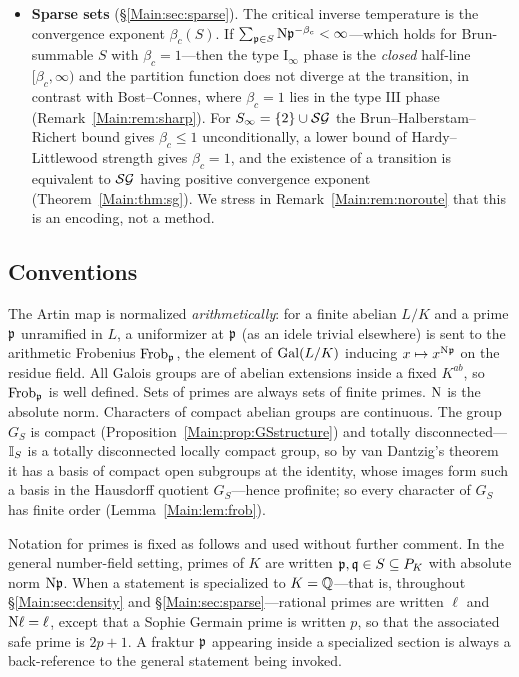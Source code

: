 \begin{itemize}
Borel--Cantelli condition, while density needs only $R\neq\emptyset$. The
underlying dichotomy is Kakutani's (Remark~\ref{Main:rem:kakutani}). We also show
$\beta\mapsto\Xi_\beta$ is non-decreasing and construct cascades of transitions
(Proposition~\ref{Main:prop:cascade}).
\item \textbf{Sparse sets} (\S\ref{Main:sec:sparse}). The critical inverse
temperature is the convergence exponent $\beta_c(S)$. If
$\sum_{\mathfrak{p}\in S}\mathrm{N}\mathfrak{p}^{-\beta_c}<\infty$---which holds for Brun-summable $S$
with $\beta_c=1$---then the type $\mathrm I_\infty$ phase is the \emph{closed}
half-line $[\beta_c,\infty)$ and the partition function does not diverge at the
transition, in contrast with Bost--Connes, where $\beta_c=1$ lies in the type
$\mathrm{III}$ phase (Remark~\ref{Main:rem:sharp}). For $S_\infty=\{2\}\cup\mathcal{SG}$ the
Brun--Halberstam--Richert bound gives $\beta_c\le1$ unconditionally, a lower
bound of Hardy--Littlewood strength gives $\beta_c=1$, and the existence of a
transition is equivalent to $\mathcal{SG}$ having positive convergence exponent
(Theorem~\ref{Main:thm:sg}). We stress in Remark~\ref{Main:rem:noroute} that this is an
encoding, not a method.
\end{itemize}

\subsection*{Conventions}

The Artin map is normalized \emph{arithmetically}: for a finite abelian $L/K$
and a prime $\mathfrak{p}$ unramified in $L$, a uniformizer at $\mathfrak{p}$ (as an idele
trivial elsewhere) is sent to the arithmetic Frobenius $\operatorname{Frob}_{\mathfrak{p}}$, the
element of $\operatorname{Gal}(L/K)$ inducing $x\mapsto x^{\mathrm{N}\mathfrak{p}}$ on the residue field.
All Galois groups are of abelian extensions inside a fixed $K^{ab}$, so
$\operatorname{Frob}_{\mathfrak{p}}$ is well defined. Sets of primes are always sets of finite primes.
$\mathrm{N}$ is the absolute norm. Characters of compact abelian groups are
continuous. The group $G_S$ is compact (Proposition~\ref{Main:prop:GSstructure}) and totally
disconnected---$\mathbb{I}_S$ is a totally disconnected locally compact group, so by van Dantzig's
theorem it has a basis of compact open subgroups at the identity, whose images form such a
basis in the Hausdorff quotient $G_S$---hence profinite; so every character of $G_S$ has
finite order (Lemma~\ref{Main:lem:frob}).

Notation for primes is fixed as follows and used without further comment. In the general
number-field setting, primes of $K$ are written $\mathfrak{p},\mathfrak{q}\in S\subseteq P_K$ with absolute
norm $\mathrm{N}\mathfrak{p}$. When a statement is specialized to $K=\mathbb{Q}$---that is, throughout
\S\ref{Main:sec:density} and \S\ref{Main:sec:sparse}---rational primes are written $\ell$ and
$\mathrm{N}\ell=\ell$, except that a Sophie Germain prime is written $p$, so that the associated
safe prime is $2p+1$. A fraktur $\mathfrak{p}$ appearing inside a specialized section is always a
back-reference to the general statement being invoked.

